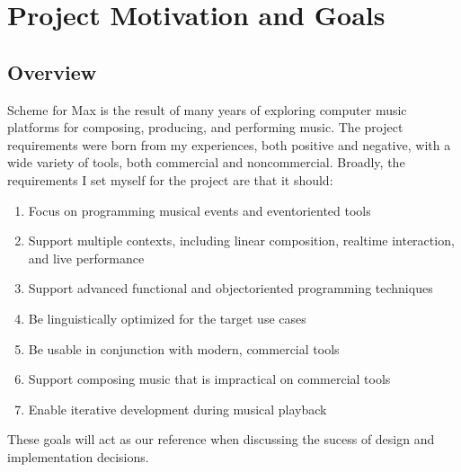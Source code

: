 \documentclass[letterpaper,10pt,english]{sphinxmanual}
\begin{document}
\sphinxstepscope


\chapter{Project Motivation and Goals}
\label{\detokenize{goals:project-motivation-and-goals}}\label{\detokenize{goals::doc}}

\section{Overview}
\label{\detokenize{goals:overview}}
\sphinxAtStartPar
Scheme for Max is the result of many years of exploring computer music platforms for composing, producing,
and performing music.
The project requirements were born from my experiences, both positive and negative, with a wide variety
of tools, both commercial and non\sphinxhyphen{}commercial.
Broadly, the requirements I set myself for the project are that it should:
\begin{enumerate}
%
\item {} 
\sphinxAtStartPar
Focus on programming musical events and event\sphinxhyphen{}oriented tools

\item {} 
\sphinxAtStartPar
Support multiple contexts, including linear composition, real\sphinxhyphen{}time interaction, and live performance

\item {} 
\sphinxAtStartPar
Support advanced functional and object\sphinxhyphen{}oriented programming techniques

\item {} 
\sphinxAtStartPar
Be linguistically optimized for the target use cases

\item {} 
\sphinxAtStartPar
Be usable in conjunction with modern, commercial tools

\item {} 
\sphinxAtStartPar
Support composing music that is impractical on commercial tools

\item {} 
\sphinxAtStartPar
Enable iterative development during musical playback

\end{enumerate}

\sphinxAtStartPar
These goals will act as our reference when discussing the sucess of design and implementation decisions.
\end{document}

